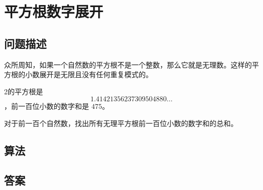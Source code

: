 \section{平方根数字展开}\label{sec:problem80}
\subsection{问题描述}
\begin{tcolorbox}
	众所周知，如果一个自然数的平方根不是一个整数，那么它就是无理数。这样的平方根的小数展开是无限且没有任何重复模式的。

	2的平方根是
	\[1.41421356237309504880 \ldots\]
	，前一百位小数的数字和是 \(475\)。

	对于前一百个自然数，找出所有无理平方根前一百位小数的数字和的总和。

\end{tcolorbox}

\subsection{算法}

\subsection{答案}
